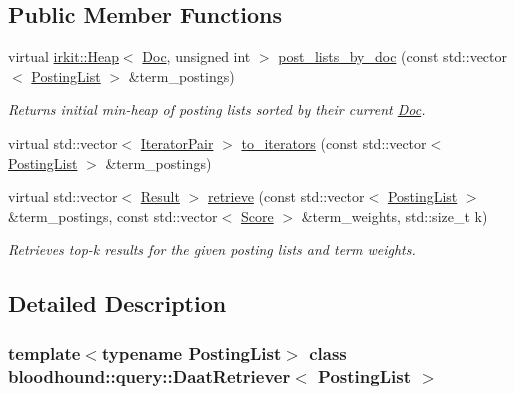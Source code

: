 \subsection*{Public Member Functions}
\begin{DoxyCompactItemize}
\item 
virtual \hyperlink{classirkit_1_1Heap}{irkit\+::\+Heap}$<$ \hyperlink{structbloodhound_1_1Doc}{Doc}, unsigned int $>$ \hyperlink{classbloodhound_1_1query_1_1DaatRetriever_abf9a1012732fe0879d1bf080faf293b6}{post\+\_\+lists\+\_\+by\+\_\+doc} (const std\+::vector$<$ \hyperlink{classbloodhound_1_1PostingList}{Posting\+List} $>$ \&term\+\_\+postings)
\begin{DoxyCompactList}\small\item\em Returns initial min-\/heap of posting lists sorted by their current \hyperlink{structbloodhound_1_1Doc}{Doc}. \end{DoxyCompactList}\item 
virtual std\+::vector$<$ \hyperlink{structbloodhound_1_1query_1_1DaatRetriever_1_1IteratorPair}{Iterator\+Pair} $>$ \hyperlink{classbloodhound_1_1query_1_1DaatRetriever_a5b10288f90a4fc4d89f56971bdc48363}{to\+\_\+iterators} (const std\+::vector$<$ \hyperlink{classbloodhound_1_1PostingList}{Posting\+List} $>$ \&term\+\_\+postings)
\item 
virtual std\+::vector$<$ \hyperlink{structbloodhound_1_1query_1_1Result}{Result} $>$ \hyperlink{classbloodhound_1_1query_1_1DaatRetriever_ab80b4867fc263827dc2fdbe0965a2e8c}{retrieve} (const std\+::vector$<$ \hyperlink{classbloodhound_1_1PostingList}{Posting\+List} $>$ \&term\+\_\+postings, const std\+::vector$<$ \hyperlink{structbloodhound_1_1Score}{Score} $>$ \&term\+\_\+weights, std\+::size\+\_\+t k)
\begin{DoxyCompactList}\small\item\em Retrieves top-\/k results for the given posting lists and term weights. \end{DoxyCompactList}\end{DoxyCompactItemize}


\subsection{Detailed Description}
\subsubsection*{template$<$typename Posting\+List$>$\newline
class bloodhound\+::query\+::\+Daat\+Retriever$<$ Posting\+List $>$}


